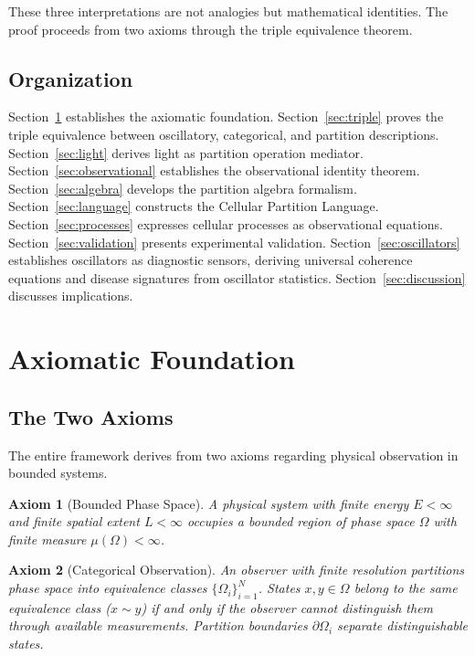\documentclass[aps,prd,twocolumn,superscriptaddress,floatfix,nofootinbib]{revtex4-2}
\newtheorem{axiom}{Axiom}
\theoremstyle{remark}
\begin{document}
These three interpretations are not analogies but mathematical identities. The proof proceeds from two axioms through the triple equivalence theorem.

\subsection{Organization}

Section~\ref{sec:axioms} establishes the axiomatic foundation. Section~\ref{sec:triple} proves the triple equivalence between oscillatory, categorical, and partition descriptions. Section~\ref{sec:light} derives light as partition operation mediator. Section~\ref{sec:observational} establishes the observational identity theorem. Section~\ref{sec:algebra} develops the partition algebra formalism. Section~\ref{sec:language} constructs the Cellular Partition Language. Section~\ref{sec:processes} expresses cellular processes as observational equations. Section~\ref{sec:validation} presents experimental validation. Section~\ref{sec:oscillators} establishes oscillators as diagnostic sensors, deriving universal coherence equations and disease signatures from oscillator statistics. Section~\ref{sec:discussion} discusses implications.

\section{Axiomatic Foundation}
\label{sec:axioms}

\subsection{The Two Axioms}

The entire framework derives from two axioms regarding physical observation in bounded systems.

\begin{axiom}[Bounded Phase Space]
\label{ax:bounded}
A physical system with finite energy $E < \infty$ and finite spatial extent $L < \infty$ occupies a bounded region of phase space $\Omega$ with finite measure $\mu(\Omega) < \infty$.
\end{axiom}

\begin{axiom}[Categorical Observation]
\label{ax:categorical}
An observer with finite resolution partitions phase space into equivalence classes $\{\Omega_i\}_{i=1}^N$. States $x, y \in \Omega$ belong to the same equivalence class ($x \sim y$) if and only if the observer cannot distinguish them through available measurements. Partition boundaries $\partial \Omega_i$ separate distinguishable states.
\end{axiom}
\end{document}

